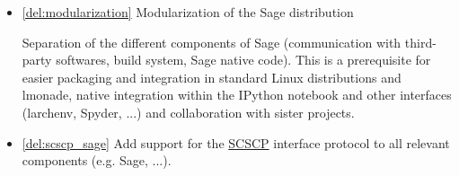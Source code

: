 \begin{Workpackage}{\thewpno}
\begin{WPDeliverables}
\begin{itemize}

    \item \ref{del:modularization} Modularization of the Sage distribution

      Separation of the different components of Sage (communication with
      third-party softwares, build system, Sage native code). This is a
      prerequisite for easier packaging and integration in standard Linux
      distributions and lmonade, native integration within the IPython
      notebook and other interfaces (larchenv, Spyder, ...) and
      collaboration with sister projects.



    \item \ref{del:scscp_sage} Add support for the
      \href{http://www.symbolic-computing.org/}{SCSCP} interface protocol
      to all relevant components (e.g. Sage, ...).


\end{itemize}
\end{WPDeliverables}
\end{Workpackage}
